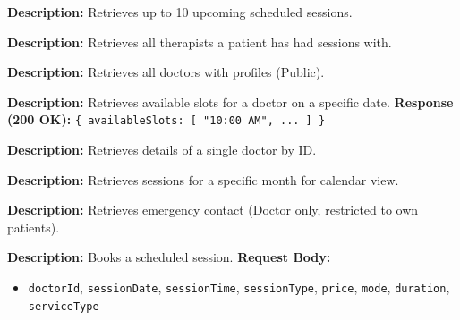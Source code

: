\documentclass{article}
\begin{document}
\begin{tcolorbox}[title=\textcolor{accent}{GET} /api/sessions/upcoming]
\textbf{Description:} Retrieves up to 10 upcoming scheduled sessions.
\end{tcolorbox}

\begin{tcolorbox}[title=\textcolor{accent}{GET} /api/sessions/my-therapists]
\textbf{Description:} Retrieves all therapists a patient has had sessions with.
\end{tcolorbox}

\begin{tcolorbox}[title=\textcolor{accent}{GET} /api/sessions/doctors]
\textbf{Description:} Retrieves all doctors with profiles (Public).
\end{tcolorbox}

\begin{tcolorbox}[title=\textcolor{accent}{GET} /api/sessions/doctors/:doctorId/slots/:date]
\textbf{Description:} Retrieves available slots for a doctor on a specific date.
\vspace{0.5em}
\textbf{Response (200 OK):} \texttt{\{ availableSlots: [ "10:00 AM", ... ] \}}
\end{tcolorbox}

\begin{tcolorbox}[title=\textcolor{accent}{GET} /api/sessions/doctors/:doctorId]
\textbf{Description:} Retrieves details of a single doctor by ID.
\end{tcolorbox}

\begin{tcolorbox}[title=\textcolor{accent}{GET} /api/sessions/calendar/:year/:month]
\textbf{Description:} Retrieves sessions for a specific month for calendar view.
\end{tcolorbox}

\begin{tcolorbox}[title=\textcolor{accent}{GET} /api/sessions/patients/:patientId/emergency-contact]
\textbf{Description:} Retrieves emergency contact (Doctor only, restricted to own patients).
\end{tcolorbox}

\begin{tcolorbox}[title=\textcolor{accent}{POST} /api/sessions/book]
\textbf{Description:} Books a scheduled session.
\vspace{0.5em}
\textbf{Request Body:}
\begin{itemize}
    \item \texttt{doctorId}, \texttt{sessionDate}, \texttt{sessionTime}, \texttt{sessionType}, \texttt{price}, \texttt{mode}, \texttt{duration}, \texttt{serviceType}
\end{itemize}
\end{tcolorbox}
\end{document}
